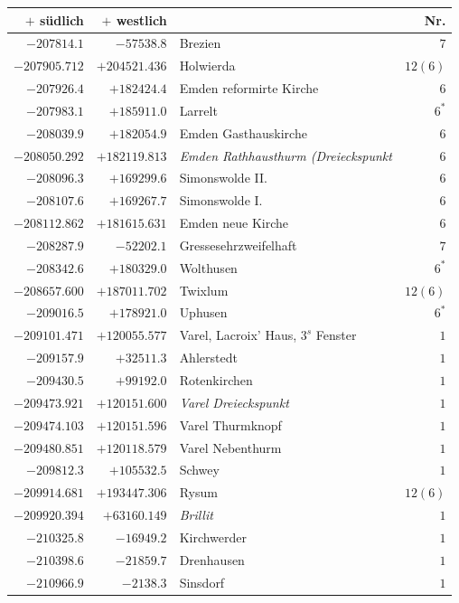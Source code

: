\begin{center}\begingroup\fontsize{8}{9}\selectfont
\setlength{\tabcolsep}{4pt}
\begin{tabular}{r|r|p{170pt}|r}\hline
\(+\) südlich&\(+\) westlich&&Nr.\\\hline
\(-207814.1\)&\(-57538.8\)&Brezien&\(7\)\\
\(-207905.712\)&\(+204521.436\)&Holwierda&\(12 (6)\)\\
\(-207926.4\)&\(+182424.4\)&Emden reformirte Kirche&\(6\)\\
\(-207983.1\)&\(+185911.0\)&Larrelt&\(6^{*}\)\\
\(-208039.9\)&\(+182054.9\)&Emden Gasthauskirche&\(6\)\\
\(-208050.292\)&\(+182119.813\)&\textit{Emden Rathhausthurm (Dreieckspunkt}&\(6\)\\
\(-208096.3\)&\(+169299.6\)&Simonswolde II.&\(6\)\\
\(-208107.6\)&\(+169267.7\)&Simonswolde I.&\(6\)\\
\(-208112.862\)&\(+181615.631\)&Emden neue Kirche&\(6\)\\
\(-208287.9\)&\(-52202.1\)&Gressesehrzweifelhaft&\(7\)\\
\(-208342.6\)&\(+180329.0\)&Wolthusen&\(6^{*}\)\\
\(-208657.600\)&\(+187011.702\)&Twixlum&\(12 (6)\)\\
\(-209016.5\)&\(+178921.0\)&Uphusen&\(6^{*}\)\\
\(-209101.471\)&\(+120055.577\)&Varel, Lacroix’ Haus, \(3^{s}\) Fenster&\(1\)\\
\(-209157.9\)&\(+32511.3\)&Ahlerstedt&\(1\)\\
\(-209430.5\)&\(+99192.0\)&Rotenkirchen&\(1\)\\
\(-209473.921\)&\(+120151.600\)&\textit{Varel Dreieckspunkt}&\(1\)\\
\(-209474.103\)&\(+120151.596\)&Varel Thurmknopf&\(1\)\\
\(-209480.851\)&\(+120118.579\)&Varel Nebenthurm&\(1\)\\
\(-209812.3\)&\(+105532.5\)&Schwey&\(1\)\\
\(-209914.681\)&\(+193447.306\)&Rysum&\(12 (6)\)\\
\(-209920.394\)&\(+63160.149\)&\textit{Brillit}&\(1\)\\
\(-210325.8\)&\(-16949.2\)&Kirchwerder&\(1\)\\
\(-210398.6\)&\(-21859.7\)&Drenhausen&\(1\)\\
\(-210966.9\)&\(-2138.3\)&Sinsdorf&\(1\)\\

\end{tabular}
\end{center}
